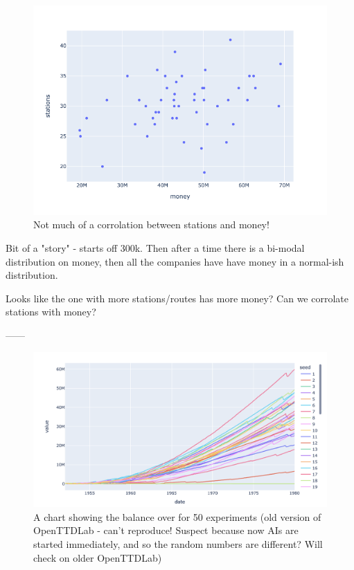 \documentclass[logo,msc,dsti]{infthesis}    %
\begin{document}
\begin{figure}[h]
\centering
\includegraphics[width=\columnwidth]{assets/stations_vs_money.png}
\caption{Not much of a corrolation between stations and money!}
\label{fig:openttd}
\end{figure}

Bit of a "story" - starts off 300k. Then after a time there is a bi-modal distribution on money, then all the companies have have money in a normal-ish distribution.

Looks like the one with more stations/routes has more money? Can we corrolate stations with money?




------

\begin{figure}[h]
\centering
\includegraphics[width=\columnwidth]{assets/value-over-time.png}
\caption{A chart showing the balance over for 50 experiments (old version of OpenTTDLab - can't reproduce! Suspect because now AIs are started immediately, and so the random numbers are different? Will check on older OpenTTDLab)}
\label{fig:value-over-time}
\end{figure}
\end{document}
